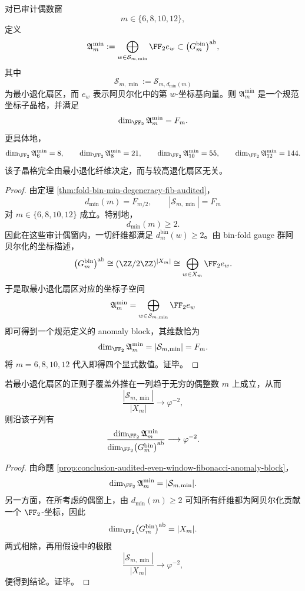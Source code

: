 \begin{proposition}\label{prop:conclusion-audited-even-window-fibonacci-anomaly-block}
对已审计偶数窗
\[
m\in\{6,8,10,12\},
\]
定义
\[
\mathfrak A_m^{\min}
:=
\bigoplus_{w\in \mathcal S_{m,\min}}\FF_2 e_w
\subset
\bigl(G_m^{\mathrm{bin}}\bigr)^{\mathrm{ab}},
\]
其中
\[
\mathcal S_{m,\min}:=\mathcal S_{m,d_{\min}(m)}
\]
为最小退化扇区，而 \(e_w\) 表示阿贝尔化中的第 \(w\)-坐标基向量。则 \(\mathfrak A_m^{\min}\) 是一个规范坐标子晶格，并满足
\[
\dim_{\FF_2}\mathfrak A_m^{\min}=F_m.
\]
更具体地，
\[
\dim_{\FF_2}\mathfrak A_6^{\min}=8,\qquad
\dim_{\FF_2}\mathfrak A_8^{\min}=21,\qquad
\dim_{\FF_2}\mathfrak A_{10}^{\min}=55,\qquad
\dim_{\FF_2}\mathfrak A_{12}^{\min}=144.
\]
该子晶格完全由最小退化纤维决定，而与较高退化扇区无关。
\end{proposition}
\begin{proof}
由定理 \ref{thm:fold-bin-min-degeneracy-fib-audited}，
\[
d_{\min}(m)=F_{m/2},
\qquad
|\mathcal S_{m,\min}|=F_m
\]
对 \(m\in\{6,8,10,12\}\) 成立。特别地，
\[
d_{\min}(m)\ge 2.
\]
因此在这些审计偶窗内，一切纤维都满足 \(d_m^{\mathrm{bin}}(w)\ge 2\)。由 bin-fold gauge 群阿贝尔化的坐标描述，
\[
\bigl(G_m^{\mathrm{bin}}\bigr)^{\mathrm{ab}}
\cong
(\ZZ/2\ZZ)^{|X_m|}
\cong
\bigoplus_{w\in X_m}\FF_2 e_w.
\]
于是取最小退化扇区对应的坐标子空间
\[
\mathfrak A_m^{\min}
=
\bigoplus_{w\in \mathcal S_{m,\min}}\FF_2 e_w
\]
即可得到一个规范定义的 anomaly block，其维数恰为
\[
\dim_{\FF_2}\mathfrak A_m^{\min}=|\mathcal S_{m,\min}|=F_m.
\]
将 \(m=6,8,10,12\) 代入即得四个显式数值。证毕。
\end{proof}

\begin{corollary}\label{cor:conclusion-minimal-anomaly-block-relative-rank-phi-square-inverse}
若最小退化扇区的正则子覆盖外推在一列趋于无穷的偶整数 \(m\) 上成立，从而
\[
\frac{|\mathcal S_{m,\min}|}{|X_m|}\longrightarrow \varphi^{-2},
\]
则沿该子列有
\[
\frac{\dim_{\FF_2}\mathfrak A_m^{\min}}
{\dim_{\FF_2}\bigl(G_m^{\mathrm{bin}}\bigr)^{\mathrm{ab}}}
\longrightarrow
\varphi^{-2}.
\]
\end{corollary}
\begin{proof}
由命题 \ref{prop:conclusion-audited-even-window-fibonacci-anomaly-block}，
\[
\dim_{\FF_2}\mathfrak A_m^{\min}=|\mathcal S_{m,\min}|.
\]
另一方面，在所考虑的偶窗上，由 \(d_{\min}(m)\ge 2\) 可知所有纤维都为阿贝尔化贡献一个 \(\FF_2\)-坐标，因此
\[
\dim_{\FF_2}\bigl(G_m^{\mathrm{bin}}\bigr)^{\mathrm{ab}}=|X_m|.
\]
两式相除，再用假设中的极限
\[
\frac{|\mathcal S_{m,\min}|}{|X_m|}\to \varphi^{-2},
\]
便得到结论。证毕。
\end{proof}

